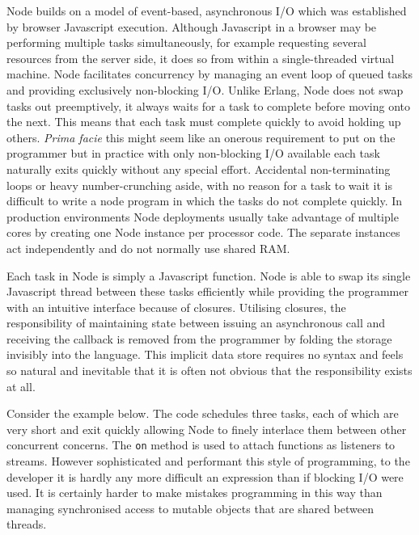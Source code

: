 \documentclass[12pt, ]{article}
\begin{document}
Node builds on a model of event-based, asynchronous I/O which was
established by browser Javascript execution. Although Javascript in a
browser may be performing multiple tasks simultaneously, for example
requesting several resources from the server side, it does so from
within a single-threaded virtual machine. Node facilitates concurrency
by managing an event loop of queued tasks and providing exclusively
non-blocking I/O. Unlike Erlang, Node does not swap tasks out
preemptively, it always waits for a task to complete before moving onto
the next. This means that each task must complete quickly to avoid
holding up others. \emph{Prima facie} this might seem like an onerous
requirement to put on the programmer but in practice with only
non-blocking I/O available each task naturally exits quickly without any
special effort. Accidental non-terminating loops or heavy
number-crunching aside, with no reason for a task to wait it is
difficult to write a node program in which the tasks do not complete
quickly. In production environments Node deployments usually take
advantage of multiple cores by creating one Node instance per processor
code. The separate instances act independently and do not normally use
shared RAM.

Each task in Node is simply a Javascript function. Node is able to swap
its single Javascript thread between these tasks efficiently while
providing the programmer with an intuitive interface because of
closures. Utilising closures, the responsibility of maintaining state
between issuing an asynchronous call and receiving the callback is
removed from the programmer by folding the storage invisibly into the
language. This implicit data store requires no syntax and feels so
natural and inevitable that it is often not obvious that the
responsibility exists at all.

Consider the example below. The code schedules three tasks, each of
which are very short and exit quickly allowing Node to finely interlace
them between other concurrent concerns. The \texttt{on} method is used
to attach functions as listeners to streams. However sophisticated and
performant this style of programming, to the developer it is hardly any
more difficult an expression than if blocking I/O were used. It is
certainly harder to make mistakes programming in this way than managing
synchronised access to mutable objects that are shared between threads.
\end{document}
